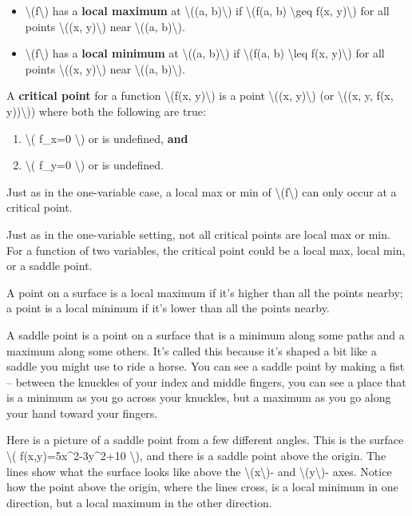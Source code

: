 \begin{itemize}
\tightlist
\item
  \textbackslash{}(f\textbackslash{}) has a \textbf{local maximum} at
  \textbackslash{}((a, b)\textbackslash{}) if \textbackslash{}(f(a, b)
  \textbackslash{}geq f(x, y)\textbackslash{}) for all points
  \textbackslash{}((x, y)\textbackslash{}) near \textbackslash{}((a,
  b)\textbackslash{}).
\item
  \textbackslash{}(f\textbackslash{}) has a \textbf{local minimum} at
  \textbackslash{}((a, b)\textbackslash{}) if \textbackslash{}(f(a, b)
  \textbackslash{}leq f(x, y)\textbackslash{}) for all points
  \textbackslash{}((x, y)\textbackslash{}) near \textbackslash{}((a,
  b)\textbackslash{}).
\end{itemize}

A \textbf{critical point} for a function \textbackslash{}(f(x,
y)\textbackslash{}) is a point \textbackslash{}((x, y)\textbackslash{})
(or \textbackslash{}((x, y, f(x, y))\textbackslash{})) where both the
following are true:

\begin{enumerate}
\tightlist
\item
  \textbackslash{}( f\_x=0 \textbackslash{}) or is undefined,
  \textbf{and}
\item
  \textbackslash{}( f\_y=0 \textbackslash{}) or is undefined.
\end{enumerate}

Just as in the one-variable case, a local max or min of
\textbackslash{}(f\textbackslash{}) can only occur at a critical point.

Just as in the one-variable setting, not all critical points are local
max or min. For a function of two variables, the critical point could be
a local max, local min, or a saddle point.

A point on a surface is a local maximum if it's higher than all the
points nearby; a point is a local minimum if it's lower than all the
points nearby.

A saddle point is a point on a surface that is a minimum along some
paths and a maximum along some others. It's called this because it's
shaped a bit like a saddle you might use to ride a horse. You can see a
saddle point by making a fist -- between the knuckles of your index and
middle fingers, you can see a place that is a minimum as you go across
your knuckles, but a maximum as you go along your hand toward your
fingers.

Here is a picture of a saddle point from a few different angles. This is
the surface \textbackslash{}( f(x,y)=5x\^{}2-3y\^{}2+10
\textbackslash{}), and there is a saddle point above the origin. The
lines show what the surface looks like above the
\textbackslash{}(x\textbackslash{})- and
\textbackslash{}(y\textbackslash{})- axes. Notice how the point above
the origin, where the lines cross, is a local minimum in one direction,
but a local maximum in the other direction.

